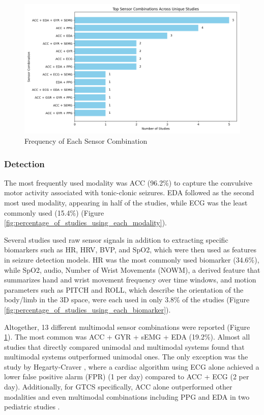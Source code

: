 \begin{figure}
    \centering
    \includegraphics[width=1\textwidth]{Results/figures/freq_of_each_sensor_comp.png}
    \caption{Frequency of Each Sensor Combination}
    \label{fig:freq_of_each_sensor_comp}
\end{figure}

\subsubsection{Detection}
The most frequently used modality was ACC (96.2\%) to capture the convulsive motor activity associated with tonic-clonic seizures. EDA followed as the second most used modality, appearing in half of the studies, while ECG was the least commonly used (15.4\%) (Figure \ref{fig:percentage_of_studies_using_each_modality}).

Several studies used raw sensor signals in addition to extracting specific biomarkers such as HR, HRV, BVP, and SpO2, which were then used as features in seizure detection models. HR was the most commonly used biomarker (34.6\%), while SpO2, audio, Number of Wrist Movements (NOWM),  a derived feature that summarizes hand and wrist movement frequency over time windows, and motion parameters such as PITCH and ROLL, which describe the orientation of the body/limb in the 3D space, were each used in only 3.8\% of the studies  (Figure \ref{fig:percentage_of_studies_using_each_biomarker}).

Altogether, 13 different multimodal sensor combinations were reported (Figure \ref{fig:freq_of_each_sensor_comp}). The most common was ACC + GYR + sEMG + EDA (19.2\%). Almost all studies that directly compared unimodal and multimodal systems \cite{Yu2023-ss,Milosevic2016-ee,De_Cooman2018-pq,Chowdhury2022-bi,Ge2023-ab, Wang2025-my,Tang2021-td,Li2022-ty,Hegarty-Craver2021-hk,Poh2012-af,Hamlin2021-sd,Wu2024-yl} found that multimodal systems outperformed unimodal ones. The only exception was the study by Hegarty-Craver \cite{Hegarty-Craver2021-hk}, where a cardiac algorithm using ECG alone achieved a lower false positive alarm (FPR) (1 per day) compared to ACC + ECG (2 per day). Additionally, for GTCS specifically, ACC alone outperformed other modalities and even multimodal combinations including PPG and EDA in two pediatric studies \cite{Yu2023-ss,Tang2021-td}. 

